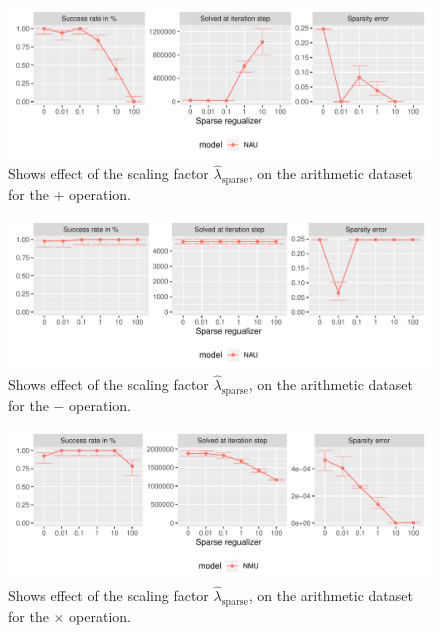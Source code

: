\begin{figure}[H]
\centering
\includegraphics[width=\linewidth]{results/simple_function_static_regualization_add.pdf}
\caption{Shows effect of the scaling factor $\hat{\lambda}_{\mathrm{sparse}}$, on the arithmetic dataset for the $\bm{+}$ operation.}
\label{fig:simple-fnction-static-regularizer-add}
\end{figure}

\begin{figure}[H]
\centering
\includegraphics[width=\linewidth]{results/simple_function_static_regualization_sub.pdf}
\caption{Shows effect of the scaling factor $\hat{\lambda}_{\mathrm{sparse}}$, on the arithmetic dataset for the $\bm{-}$ operation.}
\label{fig:simple-fnction-static-regularizer-sub}
\end{figure}

\begin{figure}[H]
\centering
\includegraphics[width=\linewidth]{results/simple_function_static_regualization_mul.pdf}
\caption{Shows effect of the scaling factor $\hat{\lambda}_{\mathrm{sparse}}$, on the arithmetic dataset for the $\bm{\times}$ operation.}
\label{fig:simple-fnction-static-regularizer-mul}
\end{figure}

